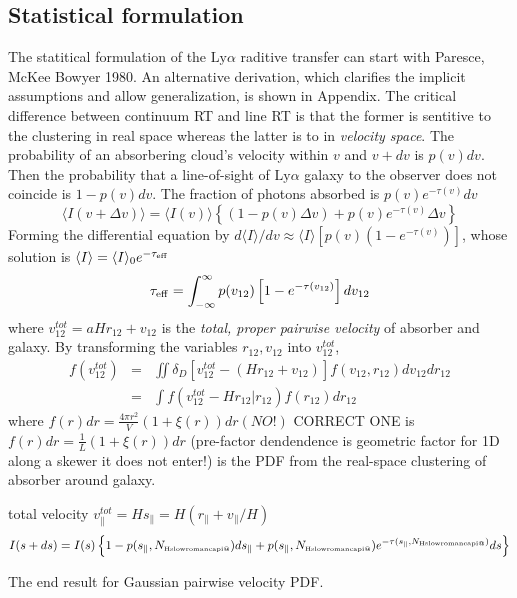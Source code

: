 \documentclass[useAMS,usenatbib,twocolumn]{mn2e}
\makeatletter
\newcommand{\Rmnum}[1]{\expandafter\@slowromancap\romannumeral #1@}
\newcommand{\LyA}{\mbox{Ly}\alpha}
\newcommand{\NHI}{N_{\mbox{\tiny H\Rmnum{1}}}}
\makeatother
\begin{document}
\subsection{Statistical formulation}
The statitical formulation of the $\LyA$ raditive transfer can start
with Paresce, McKee Bowyer 1980. An alternative derivation, which clarifies 
the implicit assumptions and allow generalization, is shown in Appendix.
The critical difference between continuum
RT and line RT is that the former is sentitive to the clustering in real
space whereas the latter is to in \textit{velocity space}.
The probability of an absorbering cloud's velocity within $v$ and $v+dv$
is $p(v)dv$. Then the probability that a line-of-sight of $\LyA$ galaxy to 
the observer does not coincide is $1-p(v)dv$. The fraction of photons absorbed
is $p(v)e^{-\tau(v)}dv$
\begin{equation}
\langle I(v+\Delta v)\rangle=\langle I(v)\rangle
\left\{
(1-p(v)\Delta v)+p(v)e^{-\tau(v)}\Delta v
\right\}
\end{equation}
Forming the differential equation by $d\langle I\rangle/dv\approx
\langle I\rangle[p(v)(1-e^{-\tau(v)})]$, whose solution is
$\langle I\rangle=\langle I\rangle_0e^{-\tau_{\rm{eff}}}$
\begin{equation}
\tau_{\rm{eff}}=\int_{-\infty}^\infty p(v_{12})\left[1-e^{-\tau(v_{12})}\right]dv_{12}
\end{equation}
where $v_{12}^{tot}=aHr_{12}+v_{12}$ is the \textit{total, proper pairwise 
velocity} of absorber and galaxy. By transforming the variables $r_{12}, v_{12}$
into $v_{12}^{tot}$,
\begin{eqnarray}
f(v_{12}^{tot})&=&\iint\delta_D\left[v_{12}^{tot}-(Hr_{12}+v_{12})\right]
f(v_{12},r_{12})dv_{12}dr_{12} \nonumber \\
&=&\int f(v_{12}^{tot}-Hr_{12}|r_{12})f(r_{12})dr_{12}
\end{eqnarray}
where $f(r)dr=\frac{4\pi r^2}{V}(1+\xi(r))dr (NO!)$ 
CORRECT ONE is $f(r)dr=\frac{1}{L}(1+\xi(r))dr$ (pre-factor
dendendence is geometric factor for 1D along a skewer it does not enter!)
is the PDF from the 
real-space clustering of absorber around galaxy.

total velocity $v_\parallel^{tot}=H s_\parallel=H(r_\parallel+v_\parallel/H)$
\begin{equation}
I(s+ds)=I(s)\left\{1-p(s_\parallel,\NHI)ds_\parallel+p(s_\parallel,\NHI)
e^{-\tau(s_\parallel,\NHI)}ds\right\}
\end{equation}


The end result for Gaussian pairwise velocity PDF.
\end{document}
